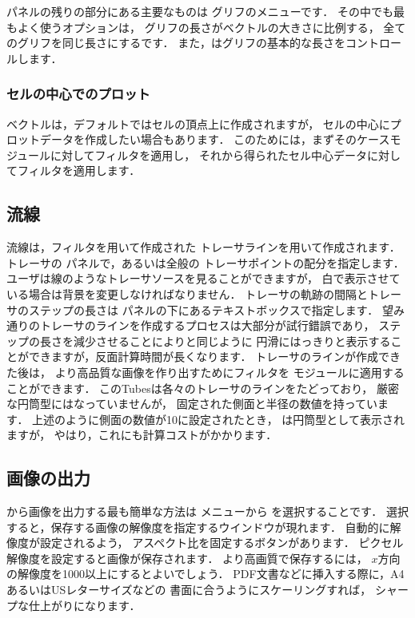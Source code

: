 パネルの残りの部分にある主要なものは
グリフのメニューです．
その中でも最もよく使うオプションは，
グリフの長さがベクトルの大きさに比例する，
全てのグリフを同じ長さにするです．
また，はグリフの基本的な長さをコントロールします．

\subsubsection{セルの中心でのプロット}
\label{sssec:6.1.7.1}
ベクトルは，デフォルトではセルの頂点上に作成されますが，
セルの中心にプロットデータを作成したい場合もあります．
このためには，まずそのケースモジュールに対してフィルタを適用し，
それから得られたセル中心データに対してフィルタを適用します．

\subsection{流線}
\label{ssec:6.1.8}
流線は，フィルタを用いて作成された
トレーサラインを用いて作成されます．
トレーサの
%
%
パネルで，あるいは全般の
トレーサポイントの配分を指定します．
ユーザは線のようなトレーサソースを見ることができますが，
白で表示させている場合は背景を変更しなければなりません．
トレーサの軌跡の間隔とトレーサのステップの長さは
パネルの下にあるテキストボックスで指定します．
望み通りのトレーサのラインを作成するプロセスは大部分が試行錯誤であり，
ステップの長さを減少させることによりと同じように
円滑にはっきりと表示することができますが，反面計算時間が長くなります．
トレーサのラインが作成できた後は，
より高品質な画像を作り出すためにフィルタを
モジュールに適用することができます．
このTubesは各々のトレーサのラインをたどっており，
厳密な円筒型にはなっていませんが，
固定された側面と半径の数値を持っています．
上述のように側面の数値が10に設定されたとき，
は円筒型として表示されますが，
やはり，これにも計算コストがかかります．


\subsection{画像の出力}
\label{ssec:6.1.9}
から画像を出力する最も簡単な方法は
メニューから
%
%
を選択することです．
選択すると，保存する画像の解像度を指定するウインドウが現れます．
自動的に解像度が設定されるよう，
アスペクト比を固定するボタンがあります．
ピクセル解像度を設定すると画像が保存されます．
より高画質で保存するには，
$x$方向の解像度を1000以上にするとよいでしょう．
PDF文書などに挿入する際に，A4あるいはUSレターサイズなどの
書面に合うようにスケーリングすれば，
シャープな仕上がりになります．


